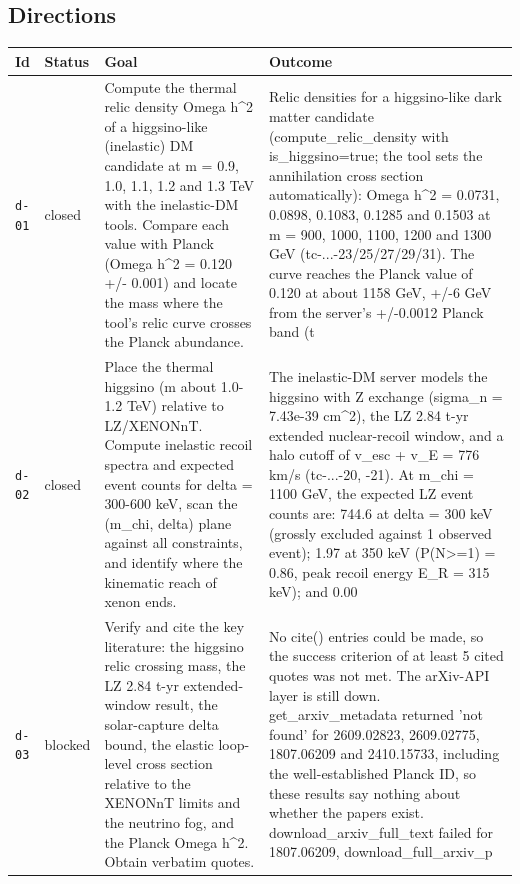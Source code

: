 \documentclass[11pt,a4paper]{article}
\begin{document}
\subsection{Directions}
\begin{longtable}{@{}p{}p{}p{}p{}@{}}
\toprule Id & Status & Goal & Outcome \\ \midrule \endhead
\texttt{d-01} & closed & Compute the thermal relic density Omega h\textasciicircum{}2 of a higgsino-like (inelastic) DM candidate at m = 0.9, 1.0, 1.1, 1.2 and 1.3 TeV with the inelastic-DM tools. Compare each value with Planck (Omega h\textasciicircum{}2 = 0.120 +/- 0.001) and locate the mass where the tool's relic curve crosses the Planck abundance. & Relic densities for a higgsino-like dark matter candidate (compute\_relic\_density with is\_higgsino=true; the tool sets the annihilation cross section automatically): Omega h\textasciicircum{}2 = 0.0731, 0.0898, 0.1083, 0.1285 and 0.1503 at m = 900, 1000, 1100, 1200 and 1300 GeV (tc-...-23/25/27/29/31). The curve reaches the Planck value of 0.120 at about 1158 GeV, +/-6 GeV from the server's +/-0.0012 Planck band (t \\
\texttt{d-02} & closed & Place the thermal higgsino (m about 1.0-1.2 TeV) relative to LZ/XENONnT. Compute inelastic recoil spectra and expected event counts for delta = 300-600 keV, scan the (m\_chi, delta) plane against all constraints, and identify where the kinematic reach of xenon ends. & The inelastic-DM server models the higgsino with Z exchange (sigma\_n = 7.43e-39 cm\textasciicircum{}2), the LZ 2.84 t-yr extended nuclear-recoil window, and a halo cutoff of v\_esc + v\_E = 776 km/s (tc-...-20, -21). At m\_chi = 1100 GeV, the expected LZ event counts are: 744.6 at delta = 300 keV (grossly excluded against 1 observed event); 1.97 at 350 keV (P(N\textgreater{}=1) = 0.86, peak recoil energy E\_R = 315 keV); and 0.00  \\
\texttt{d-03} & blocked & Verify and cite the key literature: the higgsino relic crossing mass, the LZ 2.84 t-yr extended-window result, the solar-capture delta bound, the elastic loop-level cross section relative to the XENONnT limits and the neutrino fog, and the Planck Omega h\textasciicircum{}2. Obtain verbatim quotes. & No cite() entries could be made, so the success criterion of at least 5 cited quotes was not met. The arXiv-API layer is still down. get\_arxiv\_metadata returned 'not found' for 2609.02823, 2609.02775, 1807.06209 and 2410.15733, including the well-established Planck ID, so these results say nothing about whether the papers exist. download\_arxiv\_full\_text failed for 1807.06209, download\_full\_arxiv\_p \\

\end{longtable}
\end{document}
